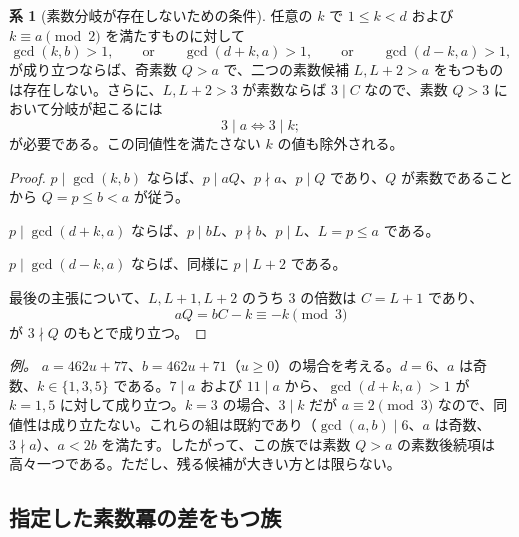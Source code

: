 \documentclass[11pt,reqno]{amsart}
\theoremstyle{definition}
\newtheorem{corollary}[theorem]{系}
\theoremstyle{definition}
\theoremstyle{remark}
\begin{document}
\begin{samepage}
\begin{corollary}[素数分岐が存在しないための条件]\leavevmode\label{thm:60}
任意の \(k\) で \(1\le k<d\) および \(k\equiv a\pmod2\) を満たすものに対して
\[
\gcd(k,b)>1,\qquad\text{or}\qquad \gcd(d+k,a)>1,\qquad\text{or}\qquad \gcd(d-k,a)>1,
\]
が成り立つならば、奇素数 \(Q>a\) で、二つの素数候補 \(L,L+2>a\) をもつものは存在しない。さらに、\(L,L+2>3\) が素数ならば \(3\mid C\) なので、素数 \(Q>3\) において分岐が起こるには
\[
3\mid a\iff3\mid k;
\]
が必要である。この同値性を満たさない \(k\) の値も除外される。
\label{thm-end:60}
\end{corollary}
\end{samepage}

\begin{proof}\leavevmode\label{proof:60}
\(p\mid\gcd(k,b)\) ならば、\(p\mid aQ\)、\(p\nmid a\)、\(p\mid Q\) であり、\(Q\) が素数であることから \(Q=p\le b<a\) が従う。

\(p\mid\gcd(d+k,a)\) ならば、\(p\mid bL\)、\(p\nmid b\)、\(p\mid L\)、\(L=p\le a\) である。

\(p\mid\gcd(d-k,a)\) ならば、同様に \(p\mid L+2\) である。

最後の主張について、\(L,L+1,L+2\) のうち \(3\) の倍数は \(C=L+1\) であり、
\[
aQ=bC-k\equiv-k\pmod3
\]
が \(3\nmid Q\) のもとで成り立つ。\qedhere
\end{proof}

\emph{例。} \(a=462u+77\)、\(b=462u+71\)（\(u\ge0\)）の場合を考える。\(d=6\)、\(a\) は奇数、\(k\in\{1,3,5\}\) である。\(7\mid a\) および \(11\mid a\) から、\(\gcd(d+k,a)>1\) が \(k=1,5\) に対して成り立つ。\(k=3\) の場合、\(3\mid k\) だが \(a\equiv2\pmod3\) なので、同値性は成り立たない。これらの組は既約であり（\(\gcd(a,b)\mid6\)、\(a\) は奇数、\(3\nmid a\)）、\(a<2b\) を満たす。したがって、この族では素数 \(Q>a\) の素数後続項は高々一つである。ただし、残る候補が大きい方とは限らない。

\subsection{指定した素数冪の差をもつ族}\label{sec:C.6}
\end{document}
